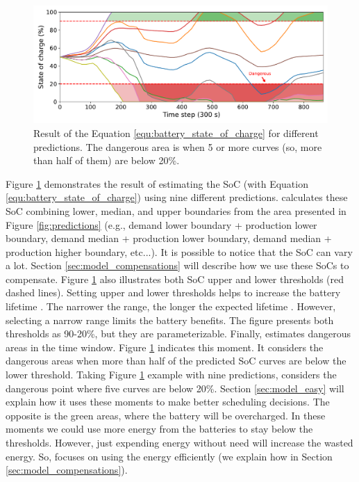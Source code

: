 \begin{figure}[!htb]
    \centering
    \includegraphics[scale=0.5]{Images/Heuristic/state_of_charge.pdf}
    \caption{Result of the Equation \ref{equ:battery_state_of_charge} for different predictions. The dangerous area is when 5 or more curves (so, more than half of them) are below 20\%.}
    \label{fig:estimated_state_of_charge}
\end{figure}

Figure \ref{fig:estimated_state_of_charge} demonstrates the result of estimating the SoC (with Equation \ref{equ:battery_state_of_charge}) using nine different predictions. \emph{\systemName} calculates these SoC combining lower, median, and upper boundaries from the area presented in Figure \ref{fig:predictions} (e.g., demand lower boundary + production lower boundary, demand median + production lower boundary, demand median + production higher boundary, etc...). It is possible to notice that the SoC can vary a lot. Section \ref{sec:model_compensations} will describe how we use these SoCs to compensate. Figure \ref{fig:estimated_state_of_charge} also illustrates both SoC upper and lower thresholds (red dashed lines). Setting upper and lower thresholds helps to increase the battery lifetime \cite{xu2016modeling}. The narrower the range, the longer the expected lifetime \cite{xu2016modeling}. However, selecting a narrow range limits the battery benefits. The figure presents both thresholds as 90-20\%, but they are parameterizable. Finally, \emph{\systemName} estimates dangerous areas in the time window. Figure \ref{fig:estimated_state_of_charge} indicates this moment. It considers the dangerous areas when more than half of the predicted SoC curves are below the lower threshold. Taking Figure \ref{fig:estimated_state_of_charge} example with nine predictions, \emph{\systemName} considers the dangerous point where five curves are below 20\%. Section \ref{sec:model_easy} will explain how it uses these moments to make better scheduling decisions. The opposite is the green areas, where the battery will be overcharged. In these moments we could use more energy from the batteries to stay below the thresholds. However, just expending energy without need will increase the wasted energy. So, \emph{\systemName} focuses on using the energy efficiently (we explain how in Section \ref{sec:model_compensations}). 

